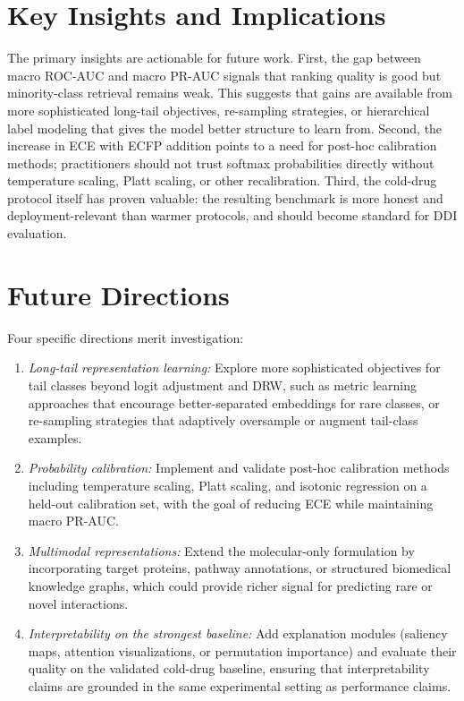 \documentclass[11pt,a4paper]{report}
\begin{document}
\section{Key Insights and Implications}
The primary insights are actionable for future work. First, the gap between macro ROC-AUC and macro PR-AUC signals that ranking quality is good but minority-class retrieval remains weak. This suggests that gains are available from more sophisticated long-tail objectives, re-sampling strategies, or hierarchical label modeling that gives the model better structure to learn from. Second, the increase in ECE with ECFP addition points to a need for post-hoc calibration methods; practitioners should not trust softmax probabilities directly without temperature scaling, Platt scaling, or other recalibration. Third, the cold-drug protocol itself has proven valuable: the resulting benchmark is more honest and deployment-relevant than warmer protocols, and should become standard for DDI evaluation.

\section{Future Directions}
Four specific directions merit investigation:
\begin{enumerate}
\item \textit{Long-tail representation learning:} Explore more sophisticated objectives for tail classes beyond logit adjustment and DRW, such as metric learning approaches that encourage better-separated embeddings for rare classes, or re-sampling strategies that adaptively oversample or augment tail-class examples.
\item \textit{Probability calibration:} Implement and validate post-hoc calibration methods including temperature scaling, Platt scaling, and isotonic regression on a held-out calibration set, with the goal of reducing ECE while maintaining macro PR-AUC.
\item \textit{Multimodal representations:} Extend the molecular-only formulation by incorporating target proteins, pathway annotations, or structured biomedical knowledge graphs, which could provide richer signal for predicting rare or novel interactions.
\item \textit{Interpretability on the strongest baseline:} Add explanation modules (saliency maps, attention visualizations, or permutation importance) and evaluate their quality on the validated cold-drug baseline, ensuring that interpretability claims are grounded in the same experimental setting as performance claims.
\end{enumerate}
\end{document}
